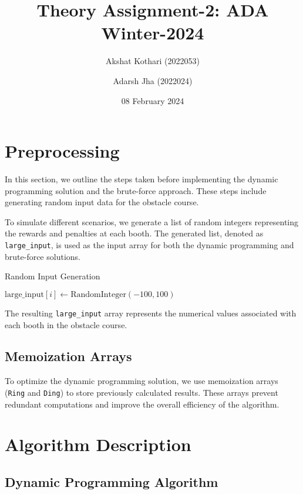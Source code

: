 \documentclass{article}
\title{Theory Assignment-2: ADA Winter-2024}
\author{Akshat Kothari (2022053) \and Adarsh Jha (2022024)}
\date{08 February 2024}
\begin{document}
\maketitle

\section{Preprocessing}

In this section, we outline the steps taken before implementing the dynamic programming solution and the brute-force approach. These steps include generating random input data for the obstacle course.


To simulate different scenarios, we generate a list of random integers representing the rewards and penalties at each booth. The generated list, denoted as \texttt{large\_input}, is used as the input array for both the dynamic programming and brute-force solutions.

\begin{algorithm}
\caption{Random Input Generation}\label{input-generation}
\begin{algorithmic}[1]
    \State $\text{large\_input}[i] \gets \text{RandomInteger}(-100, 100)$ 
\EndFor
\end{algorithmic}
\end{algorithm}

The resulting \texttt{large\_input} array represents the numerical values associated with each booth in the obstacle course.

\subsection{Memoization Arrays}

To optimize the dynamic programming solution, we use memoization arrays (\texttt{Ring} and \texttt{Ding}) to store previously calculated results. These arrays prevent redundant computations and improve the overall efficiency of the algorithm.

\section{Algorithm Description}

\subsection{Dynamic Programming Algorithm}
\end{document}
